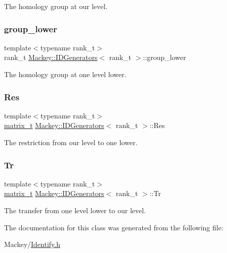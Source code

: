 The homology group at our level. 

\mbox{\label{classMackey_1_1IDGenerators_a6108bbb2965a14d7835b9d99167e7315}} 
\subsubsection{\texorpdfstring{group\+\_\+lower}{group\_lower}}
{\footnotesize\ttfamily template$<$typename rank\+\_\+t$>$ \\
rank\+\_\+t \hyperlink{classMackey_1_1IDGenerators}{Mackey\+::\+I\+D\+Generators}$<$ rank\+\_\+t $>$\+::group\+\_\+lower}



The homology group at one level lower. 

\mbox{\label{classMackey_1_1IDGenerators_a8512fc6a9becb6261a703e6131225e3f}} 
\subsubsection{\texorpdfstring{Res}{Res}}
{\footnotesize\ttfamily template$<$typename rank\+\_\+t$>$ \\
\hyperlink{classMackey_1_1IDGenerators_a6b4c91c53aa7fe61ae93a716e891832f}{matrix\+\_\+t} \hyperlink{classMackey_1_1IDGenerators}{Mackey\+::\+I\+D\+Generators}$<$ rank\+\_\+t $>$\+::Res}



The restriction from our level to one lower. 

\mbox{\label{classMackey_1_1IDGenerators_a5aa6391d6fa79951f6d11e880c79081b}} 
\subsubsection{\texorpdfstring{Tr}{Tr}}
{\footnotesize\ttfamily template$<$typename rank\+\_\+t$>$ \\
\hyperlink{classMackey_1_1IDGenerators_a6b4c91c53aa7fe61ae93a716e891832f}{matrix\+\_\+t} \hyperlink{classMackey_1_1IDGenerators}{Mackey\+::\+I\+D\+Generators}$<$ rank\+\_\+t $>$\+::Tr}



The transfer from one level lower to our level. 



The documentation for this class was generated from the following file\+:\begin{DoxyCompactItemize}
\item 
Mackey/\hyperlink{Identify_8h}{Identify.\+h}\end{DoxyCompactItemize}
